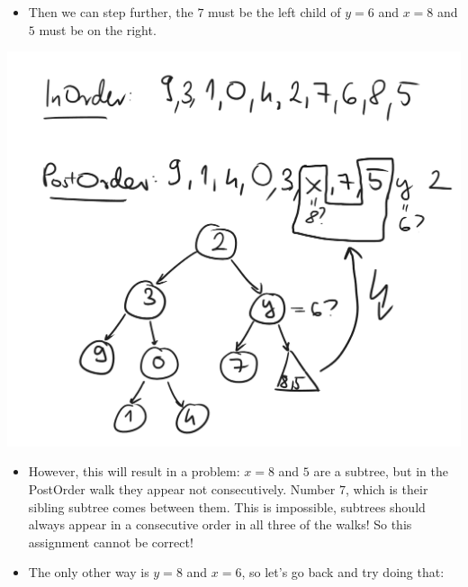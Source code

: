 \begin{itemize}
    \item Then we can step further, the $7$ must be the left child of $y=6$ and $x=8$ and $5$ must be on the right.
\end{itemize}

\begin{center}
    \includegraphics[width=\linewidth]{11/11/reconstruct_07.png}
\end{center}

\begin{itemize}
    \item However, this will result in a problem: $x=8$ and $5$ are a subtree, but in the PostOrder walk they appear not consecutively. Number $7$, which is their sibling subtree comes between them. This is impossible, subtrees should always appear in a consecutive order in all three of the walks! So this assignment cannot be correct!
    \item The only other way is $y=8$ and $x=6$, so let's go back and try doing that:
\end{itemize}


